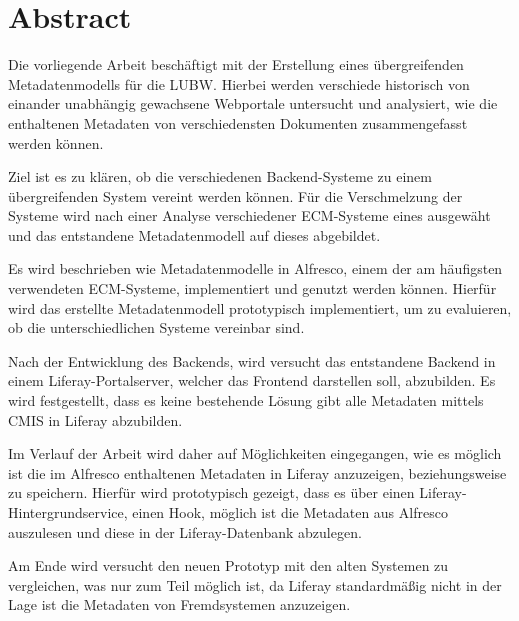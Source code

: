 \section{Abstract}
Die vorliegende Arbeit besch\"aftigt mit der Erstellung eines \"ubergreifenden Metadatenmodells f\"ur die \ac{LUBW}. Hierbei werden verschiede historisch von einander unabh\"angig gewachsene Webportale untersucht und analysiert, wie die enthaltenen Metadaten von verschiedensten Dokumenten zusammengefasst werden k\"onnen.

Ziel ist es zu kl\"aren, ob die verschiedenen Backend-Systeme zu einem \"ubergreifenden System vereint werden k\"onnen. F\"ur die Verschmelzung der Systeme wird nach einer Analyse verschiedener \ac{ECM}-Systeme eines ausgew\"aht und das entstandene Metadatenmodell auf dieses abgebildet.

Es wird beschrieben wie Metadatenmodelle in Alfresco, einem der am h\"aufigsten verwendeten {ECM}-Systeme, implementiert und genutzt werden k\"onnen. Hierf\"ur wird das erstellte Metadatenmodell prototypisch implementiert, um zu evaluieren, ob die unterschiedlichen Systeme vereinbar sind.

Nach der Entwicklung des Backends, wird versucht das entstandene Backend in einem Liferay-Portalserver, welcher das Frontend darstellen soll, abzubilden. Es wird festgestellt, dass es keine bestehende L\"osung gibt alle Metadaten mittels \ac{CMIS} in Liferay abzubilden.

Im Verlauf der Arbeit wird daher auf M\"oglichkeiten eingegangen, wie es m\"oglich ist die im Alfresco enthaltenen Metadaten in Liferay anzuzeigen, beziehungsweise zu speichern. Hierf\"ur wird prototypisch gezeigt, dass es \"uber einen Liferay-Hintergrundservice, einen Hook, m\"oglich ist die Metadaten aus Alfresco auszulesen und diese in der Liferay-Datenbank abzulegen.

Am Ende wird versucht den neuen Prototyp mit den alten Systemen zu vergleichen, was nur zum Teil m\"oglich ist, da Liferay standardm\"a\ss{}ig nicht in der Lage ist die Metadaten von Fremdsystemen anzuzeigen.